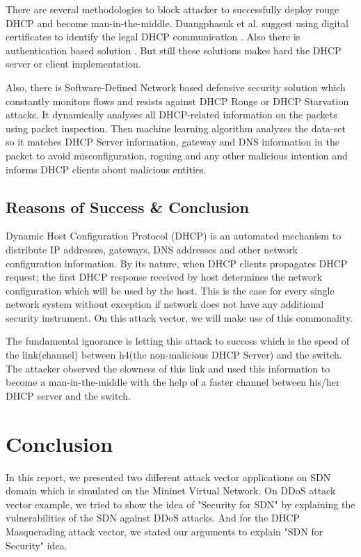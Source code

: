 \documentclass[conference,compsoc]{IEEEtran}
\begin{document}
There are several methodologies to block attacker to successfully deploy rouge DHCP and become man-in-the-middle. Duangphasuk et al. suggest using digital  certificates to identify  the legal DHCP communication \cite{DHCPCertificate}. Also there is authentication based solution \cite{DHCPAuth}. But still these solutions makes hard the DHCP server or client implementation\cite{DHCPHard}.


Also, there is Software-Defined Network based defensive security solution which constantly monitors flows and resists against DHCP Rouge or DHCP Starvation attacks. It dynamically analyses all DHCP-related information on the packets using packet inspection. Then machine learning algorithm analyzes the data-set so it matches DHCP Server information, gateway and DNS information in the packet to avoid misconfiguration, roguing and any other malicious intention and informs DHCP clients about malicious entities.


\subsection{Reasons of Success \& Conclusion}

Dynamic Host Configuration Protocol (DHCP) is an automated mechanism to distribute IP addresses, gateways, DNS addresses and other network configuration information. By its nature, when DHCP clients propagates DHCP request; the first DHCP response received by host determines the network configuration which will be used by the host. This is the case for every single network system without exception if network does not have any additional security instrument. On this attack vector, we will make use of this commonality.

The fundamental ignorance is letting this attack to success which is the speed of the link(channel) between h4(the non-malicious DHCP Server) and the switch. The attacker observed the slowness of this link and used this information to become a man-in-the-middle with the help of a faster channel between his/her DHCP server and the switch.

\section{Conclusion}

In this report, we presented two different attack vector applications on SDN domain which is simulated on the Mininet Virtual Network. On DDoS attack vector example, we tried to show the idea of "Security for SDN" by explaining the vulnerabilities of the SDN against DDoS attacks. And for the DHCP Masquerading attack vector, we stated our arguments to explain "SDN for Security" idea.
\end{document}
